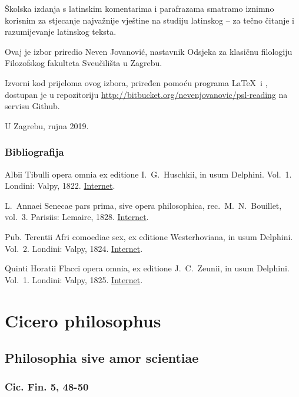 \documentclass[a4paper,12pt,twoside]{book}
\begin{document}
Školska izdanja s latinskim komentarima i parafrazama smatramo iznimno korisnim za stjecanje najvažnije vještine na studiju latinskog – za tečno čitanje i razumijevanje latinskog teksta.

Ovaj je izbor priredio Neven Jovanović, nastavnik Odsjeka za klasičnu filologiju Filozofskog fakulteta Sveučilišta u Zagrebu.

Izvorni kod prijeloma ovog izbora, priređen pomoću programa \LaTeX\ i \XeLaTeX, dostupan je u repozitoriju \url{http://bitbucket.org/nevenjovanovic/psl-reading} na servisu Github.



\medskip

U Zagrebu, rujna 2019.

\section*{Bibliografija}

{
\setlength{\parindent}{0pt}

Albii Tibulli opera omnia ex editione I.\ G.\ Huschkii, in usum Delphini. Vol.\ 1. Londini: Valpy, 1822. \href{https://archive.org/details/delphinclassics173valp}{Internet}.

L.\ Annaei Senecae pars prima, sive opera philosophica, rec.\ M.\ N.\ Bouillet, vol.\ 3. Parisiis: Lemaire, 1828. \href{https://archive.org/details/lannsenecparspr03bouigoog}{Internet}.

Pub. Terentii Afri comoediae sex, ex editione Westerhoviana, in usum Delphini. Vol.\ 2. Londini: Valpy, 1824. \href{https://archive.org/details/pubterentiiafric02tereuoft}{Internet}.

Quinti Horatii Flacci opera omnia, ex editione J.\ C.\ Zeunii, in usum Delphini. Vol.\ 1.  Londini: Valpy, 1825. \href{https://archive.org/details/delphinclassics57valp}{Internet}.

}


\part{Cicero philosophus}

\chapter{Philosophia sive amor scientiae}

\section{Cic. Fin. 5, 48-50}
\end{document}
